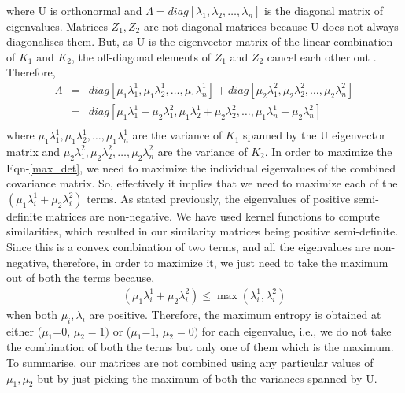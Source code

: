 where U is orthonormal and $\Lambda=diag[\lambda_{1},\lambda_{2},\dots,\lambda_{n}]$ is the diagonal matrix of eigenvalues. Matrices $Z_{1},Z_{2}$ are not diagonal matrices because U does not always diagonalises them. But, as U is the eigenvector matrix of the linear combination of $K_{1}$ and $K_{2}$, the off-diagonal elements of $Z_{1}$ and $Z_{2}$ cancel each other out \citep{thomaz2004covariance, carlos05maximum}. Therefore,
\begin{eqnarray}
\Lambda  &=& diag[\mu_{1}\lambda^{1}_{1},\mu_{1}\lambda^{1}_{2},\dots,\mu_{1}\lambda^{1}_{n}]+ diag[\mu_{2}\lambda^{2}_{1},\mu_{2}\lambda^{2}_{2},\dots,\mu_{2}\lambda^{2}_{n}] \label{eigv_split_2} \\
&=& diag[\mu_{1}\lambda^{1}_{1}+\mu_{2}\lambda^{2}_{1}, \mu_{1}\lambda^{1}_{2}+\mu_{2}\lambda^{2}_{2},\dots,\mu_{1}\lambda^{1}_{n}+\mu_{2}\lambda^{2}_{n}]  \\ 
\end{eqnarray}
where $\mu_{1}\lambda^{1}_{1},\mu_{1}\lambda^{1}_{2},\dots,\mu_{1}\lambda^{1}_{n}$ are the variance of $K_{1}$ spanned by the U eigenvector matrix and $\mu_{2}\lambda^{2}_{1},\mu_{2}\lambda^{2}_{2},\dots,\mu_{2}\lambda^{2}_{n}$ are the variance of $K_{2}$. In order to maximize the Eqn-\eqref{max_det}, we need to maximize the individual eigenvalues of the combined covariance matrix. So, effectively it implies that we need to maximize each of the $(\mu_{1}\lambda^{1}_{i}+\mu_{2}\lambda^{2}_{i})$ terms. As stated previously, the eigenvalues of positive semi-definite matrices are non-negative. We have used kernel functions to compute similarities, which resulted in our similarity matrices being positive semi-definite. Since this is a convex combination of two terms, and all the eigenvalues are non-negative, therefore, in order to maximize it, we just need to take the maximum out of both the terms because,
\begin{eqnarray}
(\mu_{1}\lambda^{1}_{i}+\mu_{2}\lambda^{2}_{i}) \leq \max (\lambda^{1}_{i},\lambda^{2}_{i})
\end{eqnarray} 
when both $\mu_{i},\lambda_{i}$ are positive. Therefore, the maximum entropy is obtained at either ($\mu_{1}$=0, $\mu_{2}=1)$ or ($\mu_{1}$=1, $\mu_{2}=0)$ for each eigenvalue, i.e., we do not take the combination of both the terms but only one of them which is the maximum. To summarise, our matrices are not combined using any particular values of $\mu_{1},\mu_{2}$ but by just picking the maximum of both the variances spanned by U. 

